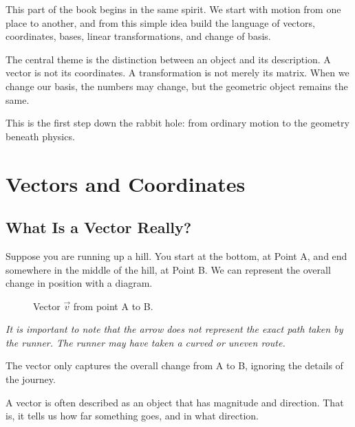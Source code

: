 \documentclass[11pt,openany]{book}
\theoremstyle{definition}
\begin{document}
\medskip

This part of the book begins in the same spirit. We start with motion from one place to
another, and from this simple idea build the language of vectors, coordinates, bases,
linear transformations, and change of basis.

\medskip

The central theme is the distinction between an object and its description. A vector is
not its coordinates. A transformation is not merely its matrix. When we change our basis,
the numbers may change, but the geometric object remains the same.

\medskip

This is the first step down the rabbit hole: from ordinary motion to the geometry beneath
physics.


\chapter{Vectors and Coordinates}

\section{What Is a Vector Really?}

Suppose you are running up a hill. You start at the bottom, at Point A, and end somewhere in the middle of the hill, at Point B. We can represent the overall change in position with a diagram.

\begin{figure}[htbp]
\centering
{}
\caption{Vector $\vec{v}$ from point A to B.}
\label{fig:vector_diagram}
\end{figure}

\textit{It is important to note that the arrow does not represent the exact path taken by the runner. The runner may have taken a curved or uneven route. }

\medskip

The vector only captures the overall change from A to B, ignoring the details of the journey.

\medskip

A vector is often described as an object that has magnitude and direction. That is, it tells us how far something goes, and in what direction.
\end{document}
